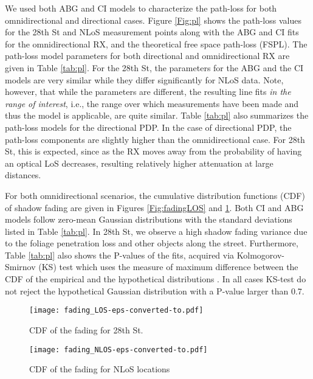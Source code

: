 \documentclass[conference]{IEEEtran}
\begin{document}
We used both ABG and CI models to characterize the path-loss for both omnidirectional and directional cases. Figure \ref{Fig:pl} shows the path-loss values for the 28th St and NLoS measurement points along with the ABG and CI fits for the omnidirectional RX, and the theoretical free space path-loss (FSPL). The path-loss model parameters for both directional and omnidirectional RX are given in Table \ref{tab:pl}. For the 28th St, the parameters for the ABG and the CI models are very similar while they differ significantly for NLoS data. Note, however, that while the parameters are different, the resulting line fits {\em in the range of interest}, i.e., the range over which measurements have been made and thus the model is applicable, are quite similar. Table \ref{tab:pl} also summarizes the path-loss models for the directional PDP. In the case of directional PDP, the path-loss components are slightly higher than the omnidirectional case. For 28th St, this is expected, since as the RX moves away from the probability of having an optical LoS decreases, resulting relatively higher attenuation at large distances. 

For both omnidirectional scenarios, the cumulative distribution functions (CDF) of shadow fading are given in Figures \ref{Fig:fadingLOS} and \ref{Fig:fadingNLOS}. Both CI and ABG models follow zero-mean Gaussian distributions with the standard deviations listed in Table \ref{tab:pl}. In 28th St, we observe a high shadow fading variance due to the foliage penetration loss and other objects along the street. Furthermore, Table \ref{tab:pl} also shows the P-values of the fits, acquired via Kolmogorov-Smirnov (KS) test which uses the measure of maximum difference between the CDF of the empirical and the hypothetical distributions \cite{massey_1951_kolmogorov}. In all cases KS-test do not reject the hypothetical Gaussian distribution with a P-value larger than 0.7. 


\begin{figure}[tbp]\centering
\begin{minipage}{0.48\linewidth} \centering
    \texttt{[image: fading\_LOS-eps-converted-to.pdf]}\caption{CDF of the fading for 28th St.}\label{Fig:fadingLOS}
\end{minipage} 
\begin{minipage}{0.03\linewidth} \centering
\end{minipage}
\begin{minipage}{0.48\linewidth} \centering
     \texttt{[image: fading\_NLOS-eps-converted-to.pdf]}\caption{CDF of the fading for NLoS locations}\label{Fig:fadingNLOS}
  \end{minipage}
\end{figure}
\end{document}
